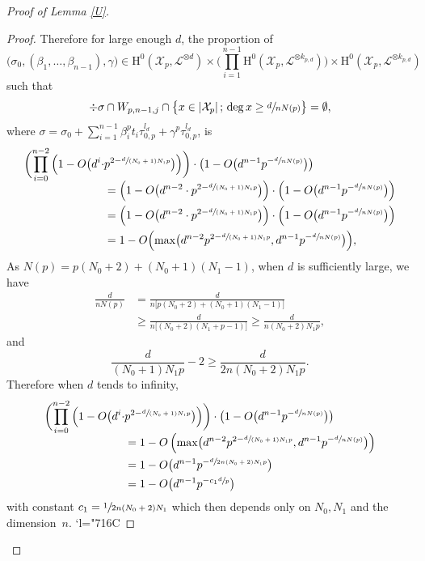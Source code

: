 \documentclass[JEP,XML,SOM,Unicode,published]{cedram}
\newcommand{\Changelback}{\mathcode`l="716C}
\newcommand{\sep}{\,;\,}
\theoremstyle{plain}
\theoremstyle{definition}
\newcommand{\ho}{\mathrm{H}}
\newcommand{\X}{\mathcal{X}}
\begin{document}
\begin{proof}[Proof of Lemma \ref{U}]
\begin{proof}[Proof]
Therefore for large enough $d$, the proportion of
\[
\big(\sigma_0, (\beta_1,\dots, \beta_{n-1}), \gamma\big)\in \ho^0(\X_p,\mathcal{L}^{\otimes d})\times \biggl(\prod_{i=1}^{n-1} \ho^0(\X_p,\mathcal{L}^{\otimes k_{p,d}}) \biggr) \times \ho^0(\X_p, \mathcal{L}^{\otimes k_{p,d}})
\]
such that
\[
\div \sigma\cap W_{p,n-1,j}\cap \bigl\{ x\in |\X_p|\sep \deg x\geq\sfrac{d}{nN(p)} \bigr\}=\emptyset,
\]
where $\sigma=\sigma_0+\sum_{i=1}^{n-1} \beta_i^pt_i\tau_{0,p}^{l_d}+\gamma^p\tau_{0,p}^{l_d}$, is
\begin{align*}
\biggl(\prod_{i=0}^{n-2}\Big(1-O\big(d^i\cdot &p^{2-\sfrac{d}{(N_0+1)N_1p}}\big) \Big) \biggr) \cdot \bigl(1-O\big(d^{n-1}p^{-\sfrac{d}{nN(p)}}\big) \bigr) \\[-5pt]
&=\left(1-O\big(d^{n-2}\cdot p^{2-\sfrac{d}{(N_0+1)N_1p}} \big)\right)\cdot \left(1-O\big(d^{n-1}p^{-\sfrac{d}{nN(p)}}\big) \right) \\
&=\left(1-O\big(d^{n-2}\cdot p^{2-\sfrac{d}{(N_0+1)N_1p}} \big)\right)\cdot \left(1-O\big(d^{n-1}p^{-\sfrac{d}{nN(p)}}\big) \right) \\
&=1-O\Bigl(\max\bigl(d^{n-2}p^{2-\sfrac{d}{(N_0+1)N_1p}}, d^{n-1}p^{-\sfrac{d}{nN(p)}}\bigr) \Bigr),
\end{align*}
As $N(p)=p(N_0+2)+(N_0+1)(N_1-1)$, when $d$ is sufficiently large, we have
\begin{align*}
\frac{d}{nN(p)}&= \frac{d}{n\big[p(N_0+2)+(N_0+1)(N_1-1)\big]}\\
&\geq \frac{d}{n\big[(N_0+2)(N_1+p-1)\big]}\geq \frac{d}{n(N_0+2)N_1 p},
\end{align*}
and
\[
\frac{d}{(N_0+1)N_1p}-2\geq \frac{d}{2n(N_0+2)N_1 p}.
\]
Therefore when $d$ tends to infinity,
\begin{align*}
\biggl(\prod_{i=0}^{n-2}\Big(1-O\big(d^i\cdot& p^{2-\sfrac{d}{(N_0+1)N_1p}}\big) \Big) \biggr) \cdot \bigl(1-O\big(d^{n-1}p^{-\sfrac{d}{nN(p)}}\big) \bigr) \\[-5pt]
&=1-O\left(\max\bigl(d^{n-2}p^{2-\sfrac{d}{(N_0+1)N_1p}}, d^{n-1}p^{-\sfrac{d}{nN(p)}}\bigr) \right)\\
&=1-O\bigl(d^{n-1}p^{-\sfrac{d}{2n(N_0+2)N_1 p}} \bigr)\\
&=1-O\bigl(d^{n-1}p^{-c_1\sfrac{d}{p}} \bigr)
\end{align*}
with constant $c_1=\sfrac{1}{2n(N_0+2)N_1 }$ which then depends only on $N_0,N_1$ and the dimension~$n$.
\Changelback
\end{proof}


\end{proof}
\end{document}
